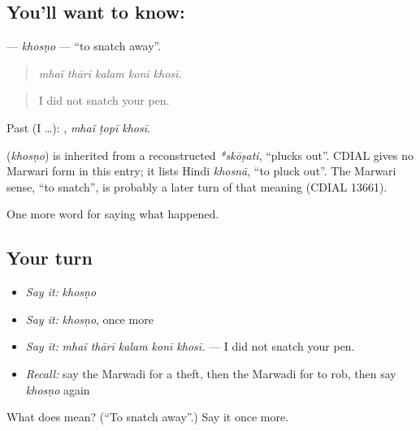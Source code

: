 \subsection*{You'll want to know: }
\textbf{} — \emph{khosṇo} — \textquotedblleft{}to snatch away\textquotedblright{}.

\begin{quote}
    
\end{quote}

\begin{quote}
\emph{mhaĩ thārī kalam konī khosī.}
\end{quote}

\begin{quote}
I did not snatch your pen.
\end{quote}

Past (I …):   , \emph{mhaĩ ṭopī khosī}.

\begin{cousinweb}
\textbf{} (\emph{khosṇo}) is inherited from a reconstructed \emph{*skōṣati}, \textquotedblleft{}plucks out\textquotedblright{}. CDIAL gives no Marwari form in this entry; it lists Hindi \emph{khosnā}, \textquotedblleft{}to pluck out\textquotedblright{}. The Marwari sense, \textquotedblleft{}to snatch\textquotedblright{}, is probably a later turn of that meaning (CDIAL 13661).
\end{cousinweb}

\begin{grammarlens}[title={What you've built}]
One more word for saying what happened.
\end{grammarlens}

\subsection*{Your turn}
\begin{itemize}
\raggedright
  \item \emph{Say it:} \emph{khosṇo}
  \item \emph{Say it:} \emph{khosṇo}, once more
  \item \emph{Say it:} \emph{mhaĩ thārī kalam konī khosī.} — I did not snatch your pen.
  \item \emph{Recall:} say the Marwadi for a theft, then the Marwadi for to rob, then say \emph{khosṇo} again
\end{itemize}

\begin{tcolorbox}[breakable,colback=teal!4,colframe=teal!35!black,title={Before you move on}]
What does  mean? (\textquotedblleft{}To snatch away\textquotedblright{}.) Say it once more.
\end{tcolorbox}

